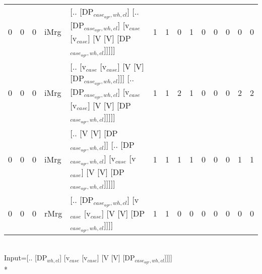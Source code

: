 \begin{tabularx}{\linewidth}{rrrlXrrrrrrrrr}
   0 &       0 &   0 & iMrg & [.. [DP$_{case_{agr},wh,cl}$] [.. [DP$_{case_{agr},wh,cl}$] [v$_{case}$ [v$_{case}$] [V [V] [DP$_{case_{agr},wh,cl}$]]]]]                           &             1 &             1 &                  0 &            1 &              0 &               0 &             0 &        0 &        0 \\
   0 &       0 &   0 & iMrg & [.. [v$_{case}$ [v$_{case}$] [V [V] [DP$_{case_{agr},wh,cl}$]]] [.. [DP$_{case_{agr},wh,cl}$] [v$_{case}$ [v$_{case}$] [V [V] [DP$_{case_{agr},wh,cl}$]]]]] &             1 &             1 &                  2 &            1 &              0 &               0 &             0 &        2 &        2 \\
   0 &       0 &   0 & iMrg & [.. [V [V] [DP$_{case_{agr},wh,cl}$]] [.. [DP$_{case_{agr},wh,cl}$] [v$_{case}$ [v$_{case}$] [V [V] [DP$_{case_{agr},wh,cl}$]]]]]                   &             1 &             1 &                  1 &            1 &              0 &               0 &             0 &        1 &        1 \\
   0 &       0 &   0 & rMrg & [.. [DP$_{case_{agr},wh,cl}$] [v$_{case}$ [v$_{case}$] [V [V] [DP$_{case_{agr},wh,cl}$]]]]                                                    &             1 &             1 &                  0 &            0 &              0 &               0 &             0 &        0 &        0 \\
\hline
\end{tabularx}\endgroup\\
\begingroup\scriptsize Input=[.. [DP$_{wh,cl}$] [v$_{case}$ [v$_{case}$] [V [V] [DP$_{case_{agr},wh,cl}$]]]]\\*
